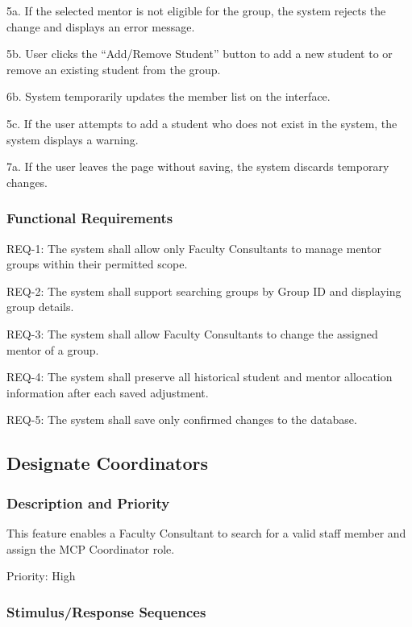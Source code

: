 5a. If the selected mentor is not eligible for the group, the system rejects the change and displays an error message.

5b. User clicks the ``Add/Remove Student'' button to add a new student to or remove an existing student from the group.

6b. System temporarily updates the member list on the interface.

5c. If the user attempts to add a student who does not exist in the system, the system displays a warning.

7a. If the user leaves the page without saving, the system discards temporary changes.

\subsubsection{Functional Requirements}

REQ-1: The system shall allow only Faculty Consultants to manage mentor groups within their permitted scope.

REQ-2: The system shall support searching groups by Group ID and displaying group details.

REQ-3: The system shall allow Faculty Consultants to change the assigned mentor of a group.

REQ-4: The system shall preserve all historical student and mentor allocation information after each saved adjustment.

REQ-5: The system shall save only confirmed changes to the database.

\subsection{Designate Coordinators}

\subsubsection{Description and Priority}

This feature enables a Faculty Consultant to search for a valid staff member and assign the MCP Coordinator role.

Priority: High

\subsubsection{Stimulus/Response Sequences}

